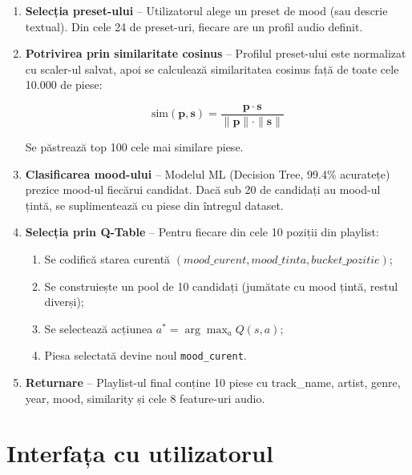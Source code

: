 \documentclass[12pt,a4paper]{article}
\begin{document}
\begin{enumerate}
    \item \textbf{Selecția preset-ului} -- Utilizatorul alege un preset de mood (sau descrie textual). Din cele 24 de preset-uri, fiecare are un profil audio definit.

    \item \textbf{Potrivirea prin similaritate cosinus} -- Profilul preset-ului este normalizat cu scaler-ul salvat, apoi se calculează similaritatea cosinus față de toate cele 10.000 de piese:

    \begin{equation}
    \text{sim}(\mathbf{p}, \mathbf{s}) = \frac{\mathbf{p} \cdot \mathbf{s}}{\|\mathbf{p}\| \cdot \|\mathbf{s}\|}
    \end{equation}

    Se păstrează top 100 cele mai similare piese.

    \item \textbf{Clasificarea mood-ului} -- Modelul ML (Decision Tree, 99.4\% acuratețe) prezice mood-ul fiecărui candidat. Dacă sub 20 de candidați au mood-ul țintă, se suplimentează cu piese din întregul dataset.

    \item \textbf{Selecția prin Q-Table} -- Pentru fiecare din cele 10 poziții din playlist:
    \begin{enumerate}
        \item Se codifică starea curentă $(mood\_curent, mood\_tinta, bucket\_pozitie)$;
        \item Se construiește un pool de 10 candidați (jumătate cu mood țintă, restul diverși);
        \item Se selectează acțiunea $a^* = \arg\max_a Q(s, a)$;
        \item Piesa selectată devine noul \texttt{mood\_curent}.
    \end{enumerate}

    \item \textbf{Returnare} -- Playlist-ul final conține 10 piese cu track\_name, artist, genre, year, mood, similarity și cele 8 feature-uri audio.
\end{enumerate}

\FloatBarrier

\section{Interfața cu utilizatorul}
\end{document}
